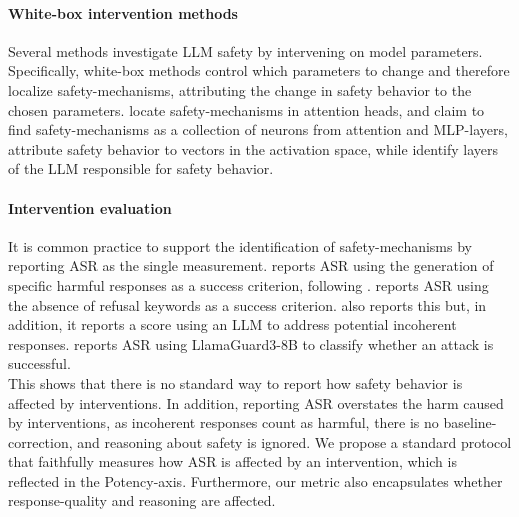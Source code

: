 \paragraph{White-box intervention methods}
Several methods investigate LLM safety by intervening on model parameters. Specifically, white-box methods control which parameters to change and therefore localize safety-mechanisms, attributing the change in safety behavior to the chosen parameters. \citep{zhou2024ships} locate safety-mechanisms in attention heads, \citep{zhao2025neuron} and \citep{yu2026safeseek} claim to find safety-mechanisms as a collection of neurons from attention and MLP-layers, \citep{arditi2024refusal} attribute safety behavior to vectors in the activation space, while \citep{li2025layers} identify layers of the LLM responsible for safety behavior. 

\paragraph{Intervention evaluation}
It is common practice to support the identification of safety-mechanisms by reporting ASR as the single measurement. \citep{zhao2025neuron} reports ASR using the generation of specific harmful responses as a success criterion, following \citep{zou2023universal}.
\citep{zhou2024ships} reports ASR using the absence of refusal keywords as a success criterion. \citet{arditi2024refusal} also reports this but, in addition, it reports a score using an LLM to address potential incoherent responses. \citep{yu2026safeseek} reports ASR using  LlamaGuard3-8B to classify whether an attack is successful.
\\
This shows that there is no standard way to report how safety behavior is affected by interventions. In addition, reporting ASR overstates the harm caused by interventions, as incoherent responses count as harmful, there is no baseline-correction, and reasoning about safety is ignored. We propose a standard protocol that faithfully measures how ASR is affected by an intervention, which is reflected in the Potency-axis. Furthermore, our metric also encapsulates whether response-quality and reasoning are affected.
